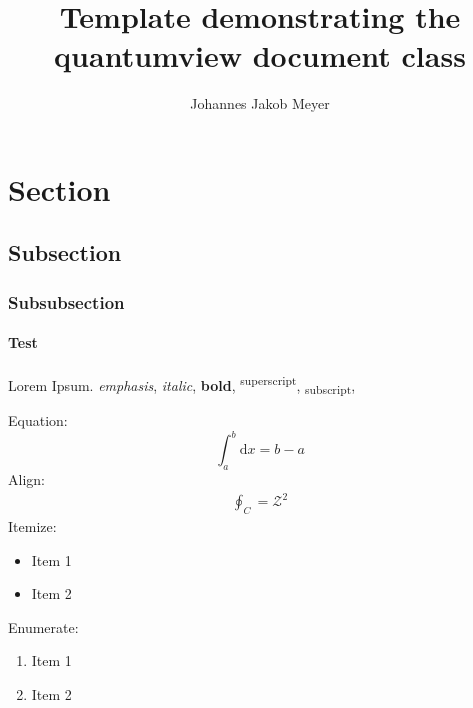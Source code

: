 \documentclass[html]{quantumview}
\begin{document}
\title{Template demonstrating the quantumview document class}

\author{Johannes Jakob Meyer}

\maketitle

\section{Section}
\subsection{Subsection}
\subsubsection{Subsubsection}
\paragraph{Test}
Lorem Ipsum. \emph{emphasis}, \textit{italic}, \textbf{bold}, \textsuperscript{superscript}, \textsubscript{subscript}, \cite{test}

Equation:
\begin{equation}
    \int_a^b \mathrm{d}x = b-a
\end{equation}
Align:
\begin{align}
    \oint_C = \mathcal{Z}^2
\end{align}
Itemize:
\begin{itemize}
    \item Item 1
    \item Item 2
\end{itemize}
Enumerate:
\begin{enumerate}
    \item Item 1
    \item Item 2
\end{enumerate}
\end{document}
